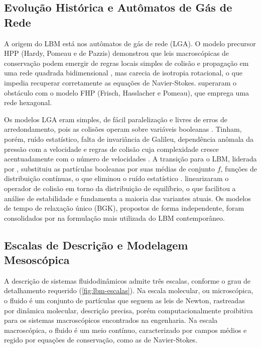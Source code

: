 
\subsection{Evolução Histórica e Autômatos de Gás de Rede}\label{subsec:lbm-historico}

A origem do LBM está nos autômatos de gás de rede (LGA).
O modelo precursor HPP (Hardy, Pomeau e de Pazzis) demonstrou que leis macroscópicas de conservação podem emergir de regras locais simples de colisão e propagação em uma rede quadrada bidimensional \parencite{HPP1973}, mas carecia de isotropia rotacional, o que impedia recuperar corretamente as equações de Navier-Stokes.
\textcite{Frisch1986} superaram o obstáculo com o modelo FHP (Frisch, Hasslacher e Pomeau), que emprega uma rede hexagonal.

Os modelos LGA eram simples, de fácil paralelização e livres de erros de arredondamento, pois as colisões operam sobre variáveis booleanas \parencite{Kruger2017}.
Tinham, porém, ruído estatístico, falta de invariância de Galileu, dependência anômala da pressão com a velocidade e regras de colisão cuja complexidade cresce acentuadamente com o número de velocidades \parencite{WolfGladrow2000}.
A transição para o LBM, liderada por \textcite{McNamara1988}, substituiu as partículas booleanas por suas médias de conjunto $f$, funções de distribuição contínuas, o que eliminou o ruído estatístico \parencite{Chen1998}.
\textcite{Higuera1989} linearizaram o operador de colisão em torno da distribuição de equilíbrio, o que facilitou a análise de estabilidade e fundamenta a maioria das variantes atuais.
Os modelos de tempo de relaxação único (BGK), propostos de forma independente, foram consolidados por \textcite{Qian1992} na formulação mais utilizada do LBM contemporâneo.


\subsection{Escalas de Descrição e Modelagem Mesoscópica}\label{subsec:lbm-escalas}

A descrição de sistemas fluidodinâmicos admite três escalas, conforme o grau de detalhamento requerido (\autoref{fig:lbm-escalas}).
Na escala molecular, ou microscópica, o fluido é um conjunto de partículas que seguem as leis de Newton, rastreadas por dinâmica molecular, descrição precisa, porém computacionalmente proibitiva para os sistemas macroscópicos encontrados na engenharia.
Na escala macroscópica, o fluido é um meio contínuo, caracterizado por campos médios e regido por equações de conservação, como as de Navier-Stokes.

